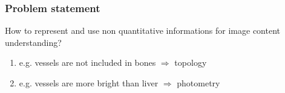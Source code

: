 		\begin{frame}
		\frametitle{Problem statement}

			\begin{block}{How to represent and use non quantitative informations for image content understanding?}
				\begin{enumerate}
					\item e.g. vessels are not included in bones $\Rightarrow$ topology
					\item e.g. vessels are more bright than liver $\Rightarrow$ photometry
				\end{enumerate}

			\end{block}
		
		\vspace{1em}	
		

\end{frame}
